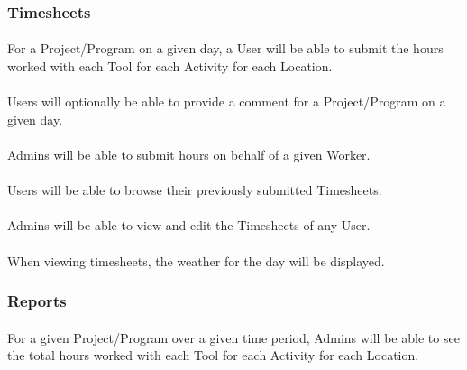 \documentclass[12pt]{article}
\begin{document}
\subsubsection{Timesheets}\label{sec:Timesheets}
\paragraph{} For a Project/Program on a given day, a User will be able to submit the hours worked with each Tool for each Activity for each Location.
\paragraph{} Users will optionally be able to provide a comment for a Project/Program on a given day.
\paragraph{} Admins will be able to submit hours on behalf of a given Worker.
\paragraph{} Users will be able to browse their previously submitted Timesheets.
\paragraph{} Admins will be able to view and edit the Timesheets of any User.
\paragraph{} When viewing timesheets, the weather for the day will be displayed.

\subsubsection{Reports}\label{sec:Reports}
\paragraph{} For a given Project/Program over a given time period, Admins will be able to see the total hours worked with each Tool for each Activity for each Location.
 
\end{document}
